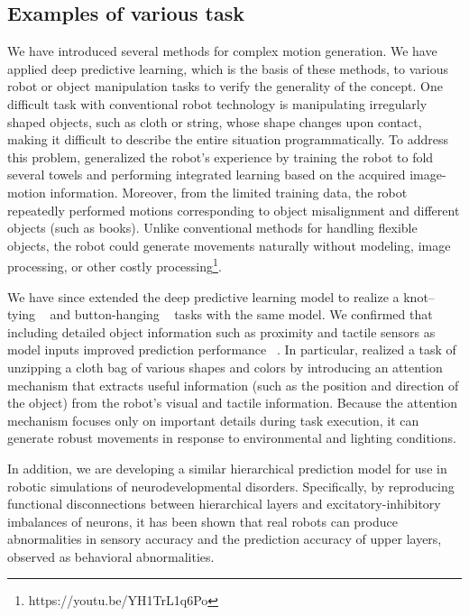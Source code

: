 \subsection{Examples of various task}
We have introduced several methods for complex motion generation. We have applied deep predictive learning, which is the basis of these methods, to various robot or object manipulation tasks to verify the generality of the concept. One difficult task with conventional robot technology is manipulating irregularly shaped objects, such as cloth or string, whose shape changes upon contact, making it difficult to describe the entire situation programmatically. To address this problem, \cite{Koma2016ral} generalized the robot's experience by training the robot to fold several towels and performing integrated learning based on the acquired image-motion information. Moreover, from the limited training data, the robot repeatedly performed motions corresponding to object misalignment and different objects (such as books). Unlike conventional methods for handling flexible objects, the robot could generate movements naturally without modeling, image processing, or other costly processing\footnote{https://youtu.be/YH1TrL1q6Po}.

We have since extended the deep predictive learning model to realize a knot--tying ~\cite{Suzuki2021iros} and button-hanging ~\cite{Fujii2022sii} tasks with the same model. We confirmed that including detailed object information such as proximity and tactile sensors as model inputs improved prediction performance ~\cite{Suzuki2021iros,Ito2022sii}. In particular, \cite{ichiwara2022contact} realized a task of unzipping a cloth bag of various shapes and colors by introducing an attention mechanism that extracts useful information (such as the position and direction of the object) from the robot's visual and tactile information. Because the attention mechanism focuses only on important details during task execution, it can generate robust movements in response to environmental and lighting conditions.

In addition, we are developing a similar hierarchical prediction model for use in robotic simulations of neurodevelopmental disorders.
Specifically, by reproducing functional disconnections between hierarchical layers \cite{idei2021paradoxical} and excitatory-inhibitory imbalances \cite{idei2020homogeneous} of neurons, it has been shown that real robots can produce abnormalities in sensory accuracy and the prediction accuracy of upper layers, observed as behavioral abnormalities.


